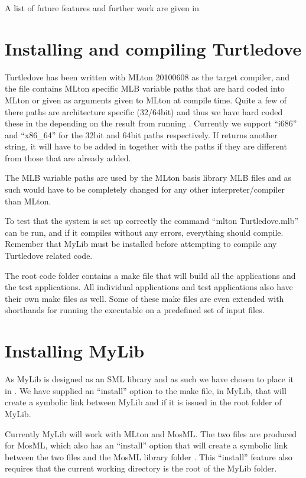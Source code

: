 A list of future features and further work are given in 


\section{Installing and compiling Turtledove}
Turtledove has been written with MLton 20100608 as the target compiler, and the
 file contains MLton specific MLB variable paths that
are hard coded into MLton or given as arguments given to MLton at compile
time. Quite a few of there paths are architecture specific (32/64bit) and thus
we have hard coded these in the  depending on the result from
running . Currently we support ``i686'' and ``x86_64'' for the
32bit and 64bit paths respectively. If  returns another string, it
will have to be added in  together with the paths if they are
different from those that are already added.  

The MLB variable paths are used by the MLton basis library MLB files and as such
would have to be completely changed for any other interpreter/compiler than
MLton.

To test that the system is set up correctly the command ``mlton Turtledove.mlb''
can be run, and if it compiles without any errors, everything should
compile. Remember that MyLib must be installed before attempting to compile any
Turtledove related code.

The root code folder contains a make file that will build all the applications
and the test applications. All individual applications and test applications
also have their own make files as well. Some of these make files are even
extended with shorthands for running the executable on a predefined set of input
files.

\section{Installing MyLib}
As MyLib is designed as an SML library and as such we have chosen to place it in
. We have supplied an ``install'' option to the
make file, in MyLib, that will create a symbolic link between MyLib and
 if it is issued in the root folder of MyLib.

Currently MyLib will work with MLton and MosML. The two  files
are produced for MosML, which also has an ``install'' option that will create a
symbolic link between the two files and the MosML library folder
. This ``install'' feature also requires that the current
working directory is the root of the MyLib folder.

